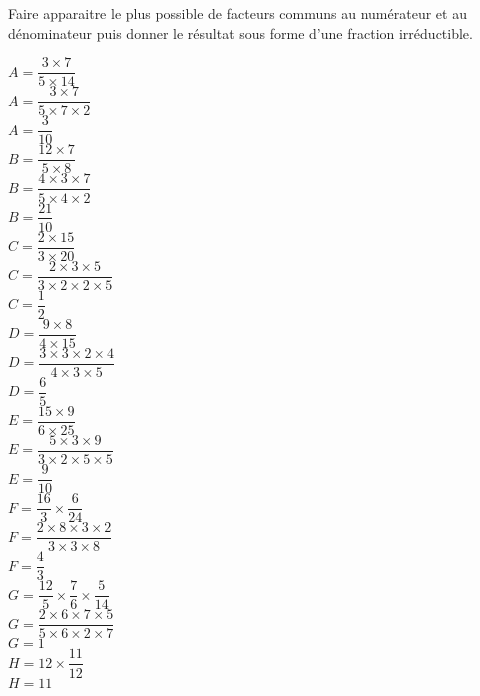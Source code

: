 \begin{corrige}
    Faire apparaitre le plus possible de facteurs communs au numérateur et au dénominateur puis donner le résultat sous forme d'une fraction irréductible.
    \begin{multicols}{2}
        \begin{spacing}{2}
            \begin{itemize}
                \def\item{}
                \item $A=\dfrac{3\times 7}{5\times 14}$\\
                {\red $A=\dfrac{3\times 7}{5\times 7\times 2}$\\$A=\dfrac{3}{10}$}\\
                \item $B=\dfrac{12\times 7}{5\times 8}$\\
                {\red $B=\dfrac{4\times 3\times 7}{5\times 4\times 2}$\\$B=\dfrac{21}{10}$}\\
                \item $C=\dfrac{2\times 15}{3\times 20}$\\
                {\red $C=\dfrac{2\times 3\times 5}{3\times 2\times 2\times 5}$\\$C=\dfrac{1}{2}$}\\
                \item $D=\dfrac{9\times 8}{4\times 15}$\\
                {\red $D=\dfrac{3\times 3\times 2\times 4}{4\times 3\times 5}$\\$D=\dfrac{6}{5}$}\\
                \columnbreak
                \item $E=\dfrac{15\times 9}{6\times 25}$\\
                {\red $E=\dfrac{5\times 3\times 9}{3\times 2\times 5\times 5}$\\$E=\dfrac{9}{10}$}\\
                \item $F=\dfrac{16}{3}\times\dfrac{6}{24}$\\
                {\red $F=\dfrac{2\times 8\times 3\times 2}{3\times 3\times 8}$\\$F=\dfrac{4}{3}$}\\
                \item $G=\dfrac{12}{5}\times\dfrac{7}{6}\times\dfrac{5}{14}$\\
                {\red $G=\dfrac{2\times 6\times 7\times 5}{5\times 6\times 2\times 7}$\\$G=1$}\\
                \item $H=12\times\dfrac{11}{12}$\\
                {\red $H=11$}
            \end{itemize}
        \end{spacing}
    \end{multicols}
\end{corrige}

